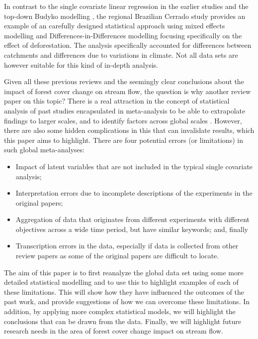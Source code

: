 \documentclass[]{elsarticle} %
\providecommand{\tightlist}{%
  \setlength{\itemsep}{0pt}\setlength{\parskip}{0pt}}
\begin{document}
In contrast to the single covariate linear regression in the earlier studies \citep{zhang2017, filoso2017} and the top-down Budyko modelling \citep{zhou2015, hoekvandijke2022}, the regional Brazilian Cerrado study \citep{levy2018} provides an example of an carefully designed statistical approach using mixed effects modelling and Differences-in-Differences modelling focusing specifically on the effect of deforestation. The analysis specifically accounted for differences between catchments and differences due to variations in climate. Not all data sets are however suitable for this kind of in-depth analysis.

Given all these previous reviews and the seemingly clear conclusions about the impact of forest cover change on stream flow, the question is why another review paper on this topic?
There is a real attraction in the concept of statistical analysis of past studies encapsulated in meta-analysis to be able to extrapolate findings to larger scales, and to identify factors across global scales \citep{evaristo2020metaanalysis}.
However, there are also some hidden complications in this that can invalidate results, which this paper aims to highlight. There are four potential errors (or limitations) in such global meta-analyses:

\begin{itemize}
\tightlist
\item
  Impact of latent variables that are not included in the typical single covariate analysis;
\item
  Interpretation errors due to incomplete descriptions of the experiments in the original papers;
\item
  Aggregation of data that originates from different experiments with different objectives across a wide time period, but have similar keywords; and, finally
\item
  Transcription errors in the data, especially if data is collected from other review papers as some of the original papers are difficult to locate.
\end{itemize}

The aim of this paper is to first reanalyze the global data set \citep{zhang2017, filoso2017} using some more detailed statistical modelling and to use this to highlight examples of each of these limitations. This will show how they have influenced the outcomes of the past work, and provide suggestions of how we can overcome these limitations. In addition, by applying more complex statistical models, we will highlight the conclusions that can be drawn from the data. Finally, we will highlight future research needs in the area of forest cover change impact on stream flow.
\end{document}
